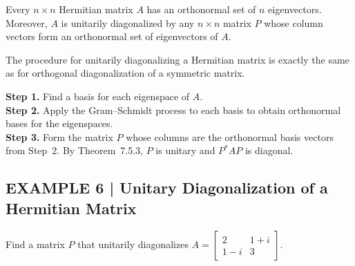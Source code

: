 \documentclass{article}
\begin{document}
\begin{tcolorbox}[colback=red!4, colframe=red!60!black,
  title={\textbf{Theorem 7.5.4}}, boxrule=0.5mm, arc=3mm]
Every $n\times n$ Hermitian matrix $A$ has an orthonormal set of $n$ eigenvectors.
Moreover, $A$ is unitarily diagonalized by any $n\times n$ matrix $P$ whose column vectors
form an orthonormal set of eigenvectors of $A$.
\end{tcolorbox}

The procedure for unitarily diagonalizing a Hermitian matrix is exactly the same as for orthogonal diagonalization of a symmetric matrix.

\begin{tcolorbox}[colback=teal!4, colframe=teal!65!black,
  title={\textbf{Unitarily Diagonalizing a Hermitian Matrix}}, boxrule=0.5mm, arc=3mm]
\textbf{Step 1.} Find a basis for each eigenspace of $A$.\\[4pt]
\textbf{Step 2.} Apply the Gram--Schmidt process to each basis to obtain orthonormal bases
for the eigenspaces.\\[4pt]
\textbf{Step 3.} Form the matrix $P$ whose columns are the orthonormal basis vectors from
Step~2. By Theorem~7.5.3, $P$ is unitary and $P^*AP$ is diagonal.
\end{tcolorbox}

\subsection*{EXAMPLE 6 | Unitary Diagonalization of a Hermitian Matrix}

Find a matrix $P$ that unitarily diagonalizes
$A = \begin{bmatrix} 2 & 1+i \\ 1-i & 3 \end{bmatrix}$.
\end{document}
